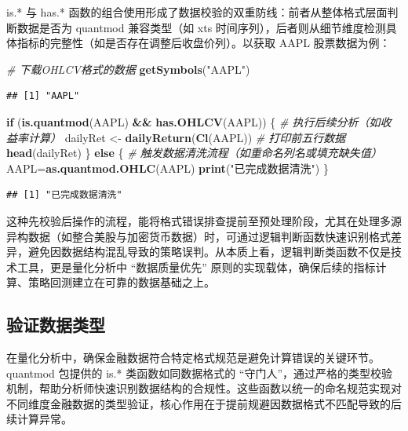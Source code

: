 \documentclass[]{ctexbook}
\newenvironment{Shaded}{\begin{snugshade}}{\end{snugshade}}
\newcommand{\CommentTok}[1]{\textcolor[rgb]{0.56,0.35,0.01}{\textit{#1}}}
\newcommand{\ControlFlowTok}[1]{\textcolor[rgb]{0.13,0.29,0.53}{\textbf{#1}}}
\newcommand{\FunctionTok}[1]{\textcolor[rgb]{0.13,0.29,0.53}{\textbf{#1}}}
\newcommand{\NormalTok}[1]{#1}
\newcommand{\OtherTok}[1]{\textcolor[rgb]{0.56,0.35,0.01}{#1}}
\newcommand{\SpecialCharTok}[1]{\textcolor[rgb]{0.81,0.36,0.00}{\textbf{#1}}}
\newcommand{\StringTok}[1]{\textcolor[rgb]{0.31,0.60,0.02}{#1}}
\begin{document}
is.* 与 has.* 函数的组合使用形成了数据校验的双重防线：前者从整体格式层面判断数据是否为 quantmod 兼容类型（如 xts 时间序列），后者则从细节维度检测具体指标的完整性（如是否存在调整后收盘价列）。以获取 AAPL 股票数据为例：

\begin{Shaded}
\begin{Highlighting}[]
\CommentTok{\# 下载OHLCV格式的数据}
\FunctionTok{getSymbols}\NormalTok{(}\StringTok{"AAPL"}\NormalTok{)  }
\end{Highlighting}
\end{Shaded}

\begin{verbatim}
## [1] "AAPL"
\end{verbatim}

\begin{Shaded}
\begin{Highlighting}[]
\ControlFlowTok{if}\NormalTok{ (}\FunctionTok{is.quantmod}\NormalTok{(AAPL) }\SpecialCharTok{\&\&} \FunctionTok{has.OHLCV}\NormalTok{(AAPL)) \{}
  \CommentTok{\# 执行后续分析（如收益率计算）}
\NormalTok{  dailyRet }\OtherTok{\textless{}{-}} \FunctionTok{dailyReturn}\NormalTok{(}\FunctionTok{Cl}\NormalTok{(AAPL))}
  \CommentTok{\# 打印前五行数据}
  \FunctionTok{head}\NormalTok{(dailyRet)}
\NormalTok{\} }\ControlFlowTok{else}\NormalTok{ \{}
  \CommentTok{\# 触发数据清洗流程（如重命名列名或填充缺失值）}
\NormalTok{  AAPL}\OtherTok{=}\FunctionTok{as.quantmod.OHLC}\NormalTok{(AAPL)}
  \FunctionTok{print}\NormalTok{(}\StringTok{"已完成数据清洗"}\NormalTok{)}
\NormalTok{\}}
\end{Highlighting}
\end{Shaded}

\begin{verbatim}
## [1] "已完成数据清洗"
\end{verbatim}

这种先校验后操作的流程，能将格式错误排查提前至预处理阶段，尤其在处理多源异构数据（如整合美股与加密货币数据）时，可通过逻辑判断函数快速识别格式差异，避免因数据结构混乱导致的策略误判。从本质上看，逻辑判断类函数不仅是技术工具，更是量化分析中 ``数据质量优先'' 原则的实现载体，确保后续的指标计算、策略回测建立在可靠的数据基础之上。

\subsection{验证数据类型}\label{ux9a8cux8bc1ux6570ux636eux7c7bux578b}

在量化分析中，确保金融数据符合特定格式规范是避免计算错误的关键环节。quantmod 包提供的 is.* 类函数如同数据格式的 ``守门人''，通过严格的类型校验机制，帮助分析师快速识别数据结构的合规性。这些函数以统一的命名规范实现对不同维度金融数据的类型验证，核心作用在于提前规避因数据格式不匹配导致的后续计算异常。
\end{document}
